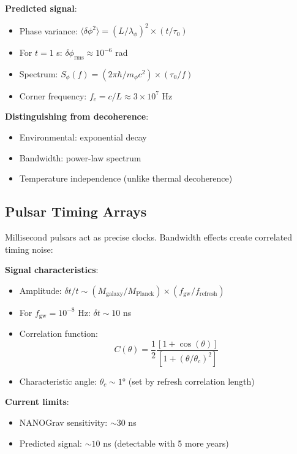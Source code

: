 \documentclass[twocolumn,prd,amsmath,amssymb,aps,superscriptaddress,nofootinbib]{revtex4-2}
\begin{document}
\textbf{Predicted signal}:
\begin{itemize}
\item Phase variance: $\langle\delta\phi^2\rangle = (L/\lambda_\phi)^2 \times (t/\tau_0)$
\item For $t = 1$ s: $\delta\phi_{\text{rms}} \approx 10^{-6}$ rad
\item Spectrum: $S_\phi(f) = (2\pi\hbar/m_\phi c^2) \times (\tau_0/f)$
\item Corner frequency: $f_c = c/L \approx 3 \times 10^7$ Hz
\end{itemize}

\textbf{Distinguishing from decoherence}:
\begin{itemize}
\item Environmental: exponential decay
\item Bandwidth: power-law spectrum
\item Temperature independence (unlike thermal decoherence)
\end{itemize}

\subsection{Pulsar Timing Arrays}

Millisecond pulsars act as precise clocks. Bandwidth effects create correlated timing noise:

\textbf{Signal characteristics}:
\begin{itemize}
\item Amplitude: $\delta t/t \sim (M_{\text{galaxy}}/M_{\text{Planck}}) \times (f_{\text{gw}}/f_{\text{refresh}})$
\item For $f_{\text{gw}} = 10^{-8}$ Hz: $\delta t \sim 10$ ns
\item Correlation function: 
\begin{equation}
C(\theta) = \frac{1}{2}\frac{[1 + \cos(\theta)]}{[1 + (\theta/\theta_c)^2]}
\end{equation}
\item Characteristic angle: $\theta_c \sim 1°$ (set by refresh correlation length)
\end{itemize}

\textbf{Current limits}: 
\begin{itemize}
\item NANOGrav sensitivity: $\sim 30$ ns
\item Predicted signal: $\sim 10$ ns (detectable with 5 more years)
\end{itemize}
\end{document}
